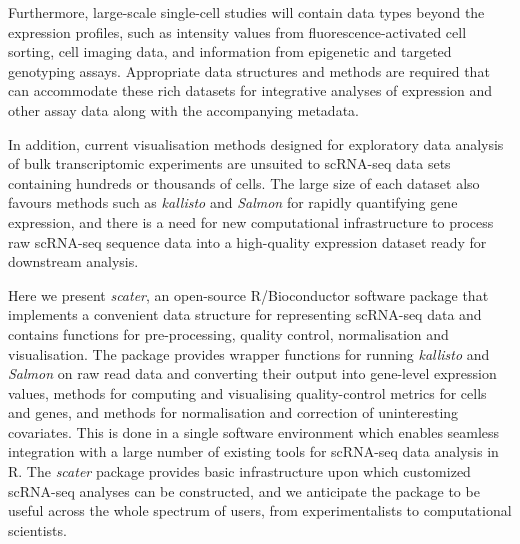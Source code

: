 \documentclass{bioinfo}
\begin{document}
Furthermore, large-scale single-cell studies will contain data types beyond the expression profiles, such as intensity values from fluorescence-activated cell sorting, cell imaging data, and information from epigenetic and targeted genotyping assays. Appropriate data structures and methods are required that can accommodate these rich datasets for integrative analyses of expression and other assay data along with the accompanying metadata.

In addition, current visualisation methods designed for exploratory data analysis of bulk transcriptomic experiments are unsuited to scRNA-seq data sets containing hundreds or thousands of cells. The large size of each dataset also favours methods such as \emph{kallisto} \citep{Bray2016-pj} and \emph{Salmon} \citep{Patro2015-jf} for rapidly quantifying gene expression, and there is a need for new computational infrastructure to process raw scRNA-seq sequence data into a high-quality expression dataset ready for downstream analysis.


Here we present \emph{scater}, an open-source R/Bioconductor software package that implements a convenient data structure for representing scRNA-seq data and contains functions for pre-processing, quality control, normalisation and visualisation. The package provides wrapper functions for running \emph{kallisto} and \emph{Salmon} on raw read data and converting their output into gene-level expression values, methods for computing and visualising quality-control metrics for cells and genes, and methods for normalisation and correction of uninteresting covariates. This is done in a single software environment which enables seamless integration with a large number of existing tools for scRNA-seq data analysis in R. The \emph{scater} package provides basic infrastructure upon which customized scRNA-seq analyses can be constructed, and we anticipate the package to be useful across the whole spectrum of users, from experimentalists to computational scientists.\vspace*{-12pt}
\end{document}
